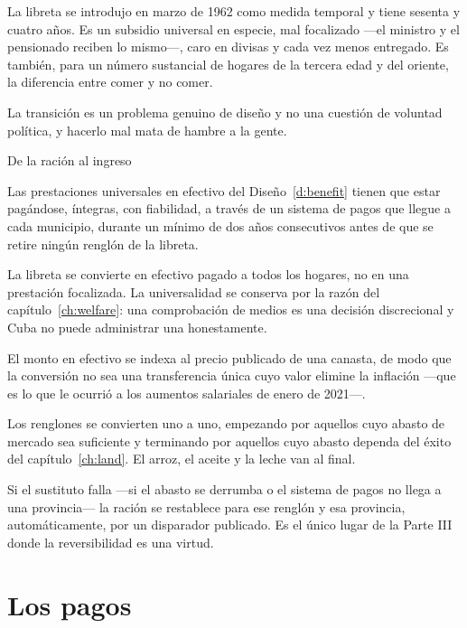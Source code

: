 La libreta se introdujo en marzo de 1962 como medida temporal y tiene sesenta y cuatro
años. Es un subsidio universal en especie, mal focalizado ---el ministro y el
pensionado reciben lo mismo---, caro en divisas y cada vez menos entregado. Es también,
para un número sustancial de hogares de la tercera edad y del oriente, la diferencia
entre comer y no comer.

La transición es un problema genuino de diseño y no una cuestión de voluntad política, y
hacerlo mal mata de hambre a la gente.

\begin{design}{De la ración al ingreso}
\label{d:libreta}
\begin{rules}
 Las prestaciones universales en
efectivo del Diseño~\ref{d:benefit} tienen que estar pagándose, íntegras, con
fiabilidad, a través de un sistema de pagos que llegue a cada municipio, durante un
mínimo de dos años consecutivos antes de que se retire ningún renglón de la libreta.

 La libreta se convierte en efectivo pagado a todos los
hogares, no en una prestación focalizada. La universalidad se conserva por la razón del
capítulo~\ref{ch:welfare}: una comprobación de medios es una decisión discrecional y
Cuba no puede administrar una honestamente.

 El monto en efectivo se indexa al precio publicado de una canasta, de
modo que la conversión no sea una transferencia única cuyo valor elimine la inflación
---que es lo que le ocurrió a los aumentos salariales de enero de 2021---.

 Los renglones se convierten uno a uno, empezando por
aquellos cuyo abasto de mercado sea suficiente y terminando por aquellos cuyo abasto
dependa del éxito del capítulo~\ref{ch:land}. El arroz, el aceite y la leche van al
final.

 Si el sustituto falla ---si el abasto se derrumba o el sistema de
pagos no llega a una provincia--- la ración se restablece para ese renglón y esa
provincia, automáticamente, por un disparador publicado. Es el único lugar de la Parte
III donde la reversibilidad es una virtud.
\end{rules}
\end{design}

\section{Los pagos}

